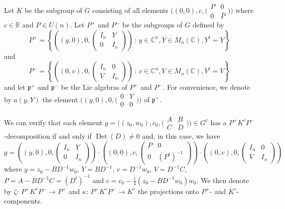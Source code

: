 \documentclass[12pt]{amsart}
\numberwithin{equation}{section}
\DeclareMathOperator{\Det}{Det} \DeclareMathOperator{\Tr}{Tr}
\begin{document}
Let $K$ be the subgroup of $G$ consisting of all
elements $\bigl((0,0),c,\bigl(\begin{smallmatrix} P&0\\
0&{\bar P}\end{smallmatrix}\bigr)\bigr)$ where $c\in {\mathbb R}$ and $P\in U(n)$.
Let $P^+$ and $P^-$ be the subgroups of $G$ defined by
\begin{equation*}P^+=\left\{\left((y,0),0,\begin{pmatrix} I_n&Y\\
0&I_n\end{pmatrix}\right)\,:\,y\in {\mathbb C}^n, Y\in M_n({\mathbb
C}),Y^t=Y\right\}\end{equation*} and
\begin{equation*}P^-=\left\{\left((0,v),0,\begin{pmatrix} I_n&0\\
V&I_n\end{pmatrix}\right)\,:\,v\in {\mathbb C}^n, V\in M_n({\mathbb
C}),V^t=V\right\}\end{equation*} 
and let ${\mathfrak p}^+$ and ${\mathfrak p}^-$ be the Lie algebras of 
$P^+$ and $P^-$. For convenience, we denote by $a(y,Y)$ the element $\bigl((y,0),0,\bigl(\begin{smallmatrix} 0&Y\\
0&0\end{smallmatrix}\bigr)\bigr)$ of ${\mathfrak p}^+$.

We can verify that each element
$g=\bigl((z_0,w_0),c_0,\bigl(\begin{smallmatrix} A&B\\
C&D\end{smallmatrix}\bigr)\bigr)\in G^c$ has a
$P^+K^cP^-$-decomposition if and only if
$\Det(D)\not= 0$ and, in this case, we have
\begin{equation*}g=\left((y,0),0,\begin{pmatrix} I_n&Y\\
0&I_n\end{pmatrix}\right)\cdot\left((0,0),c,\begin{pmatrix} P&0\\
0&(P^t)^{-1}\end{pmatrix}\right)\cdot\left((0,v),0,\begin{pmatrix} I_n&0\\
V&I_n\end{pmatrix}\right)\end{equation*} where $y=z_0-BD^{-1}w_0$,
$Y=BD^{-1}$, $v=D^{-1}w_0$, $V=D^{-1}C$, $P=A-BD^{-1}C=(D^t)^{-1}$
and $c=c_0-\tfrac{i}{4}(z_0-BD^{-1}w_0)w_0$. We then denote by
$\zeta:\, P^+K^cP^-\rightarrow P^+$ and $\kappa:\, P^+K^cP^-\rightarrow
K^c$  the projections onto $P^+$- and $K^c$-components.
\end{document}
